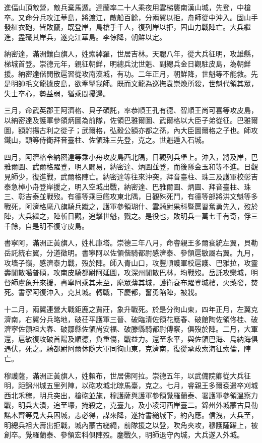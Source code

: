 \begin{pinyinscope}
進偪山頂敵營，敵兵棄馬遁。達蘭率二十人乘夜用雲梯襲南漢山城，先登，中槍卒。又命分兵攻江華島，將渡江，敵船百餘，分兩翼以拒，舟師從中沖入。固山手發紅衣砲，皆敗竄，既登岸，鳥槍手千人，復列岸以拒，固山力戰陣亡。大兵繼進，盡殲其岸兵，遂克江華島。李倧降，朝鮮以定。

納密達，滿洲鑲白旗人，姓索綽羅，世居吉林。天聰八年，從大兵征明，攻雄縣，梯城首登。崇德元年，親征朝鮮，明總兵沈世魁、副總兵金日觀駐皮島，為朝鮮援。納密達偕閒散扈習從攻南漢城，有功。二年正月，朝鮮降，世魁等不能救。先是明帥毛文龍據皮島，欲牽掣我師。既而文龍為巡撫袁崇煥所殺，世魁代領其眾，失士卒心，勢益弱，猶乘間擾邊。

三月，命武英郡王阿濟格、貝子碩託，率恭順王孔有德、智順王尚可喜等攻皮島，以納密達及護軍參領炳圖為前隊，佐領巴雅爾圖、武爾格以大臣子弟從征。巴雅爾圖，額駙揚古利之從子；武爾格，弘毅公額亦都之孫，內大臣圖爾格之子也。師攻鐵山，頭等侍衛拜音臺柱、佐領珠三先登，克之。世魁遁入石城。

四月，阿濟格令納密達等乘小舟攻皮島西北隅，日觀列兵堡上。沖入，將及岸，巴雅爾圖、武爾格躍登，明人闢易，納密達、炳圖並登，而後隊金玉和等不進。日觀見師少，復進戰，武爾格陣亡。納密達等往來沖突，拜音臺柱、珠三及護軍校彰吉泰急棹小舟登岸援之，明入空城出戰，納密達、巴雅爾圖、炳圖、拜音臺柱、珠三、彰吉泰並戰歿。有德等乘巨艦攻東北隅，日觀殊死鬥，有德等部將洪文魁等多戰死，阿濟格麾八旗騎兵蹴之，護軍參領瑚什、雲騎尉果科暨扈習奮勇先入，歿於陣，大兵繼之，陣斬日觀，追擊世魁，戮之。是役也，敗明兵一萬七千有奇，俘三千餘，自是明不復守皮島。

書寧阿，滿洲正黃旗人，姓札庫塔。崇德三年八月，命睿親王多爾袞統左翼，貝勒岳託統右翼，分道徵明。書寧阿以佐領偕騎都尉感濟泰、參領扈敏屬右翼。九月，攻墻子嶺，感濟泰力戰，歿於陣。師入青山口，攻豐順護軍校扈護、巴雅拉，攻靈壽閒散噶普碩，攻南皮騎都尉阿延圖，攻深州閒散巴林，均戰歿。岳託攻欒城，明督師盧象升來援，書寧阿乘其未至，麾眾薄其城，護衛袞布躍登城樓，火藥發，焚死。書寧阿復沖入，克其城。轉戰，下慶都，奮勇陷陣，被戕。

十二月，兩翼連營大戰鉅鹿之賈莊，象升戰死。於是分徇山東，四年正月，左翼克濟南，右翼分兵略地，破茌平護軍三晉、破臨清佐領花應春、破館陶佐領佟桂、破濟寧佐領祖大春、破鄒縣佐領尚安福、破滕縣騎都尉傅察，俱歿於陣。二月，大軍還，扈敏復攻破首陽及順德，負重傷，戰益力。還至永平，與佐領巴海、烏納海俱遇伏，死之。騎都尉阿爾休隨大軍同徇山東，克濟南，復從承政索海征索倫，陣亡。

穆護薩，滿洲正黃旗人，姓賴布，世居佛阿拉。崇德五年，以武備院卿從大兵征明，距錦州城五里列陣，以砲攻城北晾馬臺，克之。七月，睿親王多爾袞遣卒刈城西北禾稼，明兵突出，槍砲並施，穆護薩與護軍參領覺羅蘭泰、署護軍參領溫察力戰，明兵大潰，追至壕，掩殺之，克臺九，及小凌河西岸臺二。錦州外城蒙古貝勒諾木齊等見大兵困城，志必得，謀來降，遂持書縋城下，約內應。信洩，大兵至，明總兵祖大壽出拒戰，城內蒙古縋繩，前隊援之以登，吹角夾攻，穆護薩躍上，被創卒。覺羅蘭泰、參領宏科俱陣歿。鏖戰久，明師退守內城，大兵遂入外城。


\end{pinyinscope}
